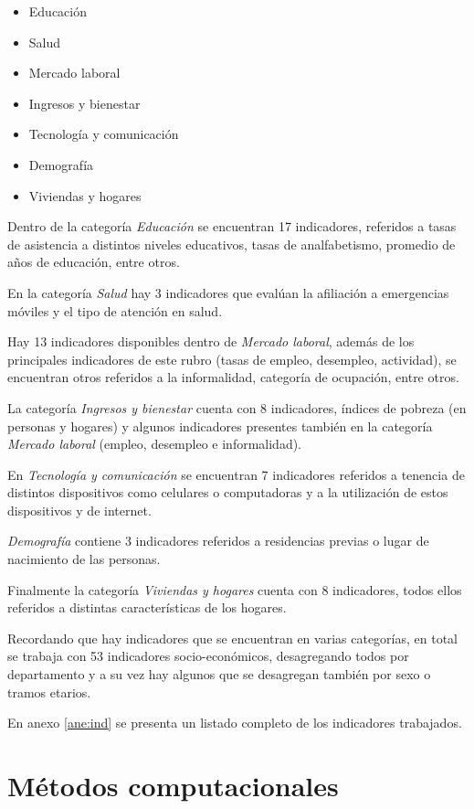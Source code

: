 \documentclass[12pt,twoside,spanish,a4paper]{book}\usepackage[]{graphicx}\usepackage[]{color}
\begin{document}
\begin{itemize}
\item Educación
\item Salud
\item Mercado laboral
\item Ingresos y bienestar
\item Tecnología y comunicación
\item Demografía
\item Viviendas y hogares

\end{itemize}

Dentro de la categoría \textit{Educación} se encuentran 17 indicadores, referidos a tasas de asistencia a distintos niveles educativos, tasas de analfabetismo, promedio de años de educación, entre otros.

En la categoría \textit{Salud} hay 3 indicadores que evalúan la afiliación a emergencias móviles y el tipo de atención en salud.

Hay 13 indicadores disponibles dentro de \textit{Mercado laboral}, además de los principales indicadores de este rubro (tasas de empleo, desempleo, actividad), se encuentran otros referidos a la informalidad, categoría de ocupación, entre otros.

La categoría \textit{Ingresos y bienestar} cuenta con 8 indicadores, índices de pobreza (en personas y hogares) y algunos indicadores presentes también en la categoría \textit{Mercado laboral} (empleo, desempleo e informalidad).

En \textit{Tecnología y comunicación} se encuentran 7 indicadores referidos a tenencia de distintos dispositivos como celulares o computadoras y a la utilización de estos dispositivos y de internet.

\textit{Demografía} contiene 3 indicadores referidos a residencias previas o lugar de nacimiento de las personas.

Finalmente la categoría \textit{Viviendas y hogares} cuenta con 8 indicadores, todos ellos referidos a distintas características de los hogares.

Recordando que hay indicadores que se encuentran en varias categorías, en total se trabaja con 53 indicadores socio-económicos, desagregando todos por departamento y a su vez hay algunos que se desagregan también por sexo o tramos etarios.

En anexo \ref{ane:ind} se presenta un listado completo de los indicadores trabajados.

\chapter{Métodos computacionales \label{cap:comp}}
\end{document}
